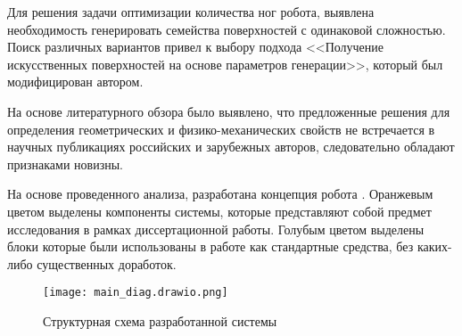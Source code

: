 Для решения задачи оптимизации количества ног робота, выявлена необходимость генерировать семейства поверхностей с одинаковой сложностью. Поиск различных вариантов привел к выбору подхода <<Получение искусственных поверхностей на основе параметров генерации>>, который был модифицирован автором.

На основе литературного обзора было выявлено, что предложенные решения для определения геометрических и физико-механических свойств не встречается в научных публикациях российских и зарубежных авторов, следовательно обладают признаками новизны.

На основе проведенного анализа, разработана концепция робота . Оранжевым цветом выделены компоненты системы, которые представляют собой предмет исследования в рамках диссертационной работы. Голубым цветом выделены блоки которые были использованы в работе как стандартные средства, без каких-либо существенных доработок.
\begin{figure}[ht!]
    \centering\texttt{[image: main\_diag.drawio.png]}
    \caption{Структурная схема разработанной системы}
    \label{fig:diag_system.png}
\end{figure}


